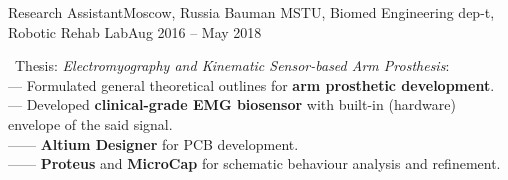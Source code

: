 \resumeSubheading
{Research Assistant}{Moscow, Russia}
{Bauman MSTU, Biomed Engineering dep-t, Robotic Rehab Lab}{Aug 2016 -- May 2018}
\begin{itemize}[leftmargin=0in, label={}]
    \small{\item{
        {\textbullet \ Thesis: \textit{Electromyography and Kinematic Sensor-based Arm Prosthesis}:}\\
        {— Formulated general theoretical outlines for \textbf{arm prosthetic development}.}\\
        {— Developed \textbf{clinical-grade EMG biosensor} with built-in (hardware) envelope of the said signal.}\\
        {—— \textbf{Altium Designer} for PCB development.}\\
        {—— \textbf{Proteus} and \textbf{MicroCap} for schematic behaviour analysis and refinement.}\\
    }}
\end{itemize}